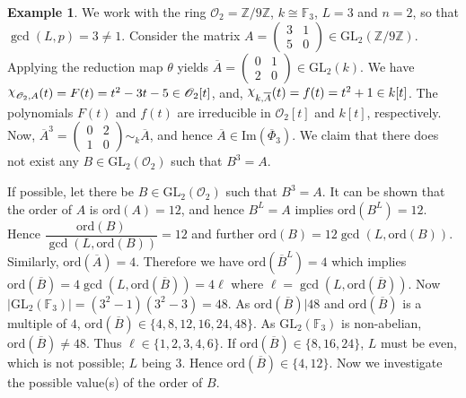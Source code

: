 \documentclass[11pt,twoside]{amsart}
\newcommand{\GL}{\mathrm{GL}}
\newcommand{\im}{\mathrm{Im}}
\newcommand{\upchi}{\raisebox{0.4ex}{$\chi$}}
\newcommand{\Char}{\upchi}
\newcommand{\R}{\mathscr{O}_2}
\theoremstyle{definition} %
\newtheorem{example}[lemma]{Example}
\begin{document}
\begin{example}
We work with the ring $\R=\mathbb{Z}/9\mathbb{Z}$, $k\cong\mathbb{F}_3$, $L=3$ and $n=2$, so that $\gcd(L,p)=3\neq 1$. 
Consider the matrix $A= \begin{pmatrix}
 3 & 1 \\
5 & 0
\end{pmatrix} \in \GL_2(\mathbb{Z}/9\mathbb{Z})$. 
Applying the reduction map $\theta$ yields $\overline{A}= \begin{pmatrix}
 0 & 1 \\
2 & 0
\end{pmatrix}\in \GL_2(k) $.
We have $\Char_{\R,A}(t)=F(t)=t^2-3t-5\in \R[t]$, and, $\Char_{k,\overline{A}}(t)=f(t)=t^2+1\in k[t]$. 
The polynomials $F(t)$ and $f(t)$ are irreducible in $\R[t]$ and $k[t]$, respectively. 
Now, $\overline{A}^3=\begin{pmatrix}
    0 & 2\\ 1 & 0
\end{pmatrix}\sim_{k}\overline{A}$, and hence $\overline{A}\in \im(\overline{\Phi}_3)$. 
We claim that there does not exist any $B\in \GL_2(\R)$ such that $B^3=A$.


If possible, let there be $B\in \GL_2(\R)$ such that $B^3=A$. It can be shown that the order of $A$ is $\textrm{ord}(A)=12$, and hence
 $B^L=A$ implies $\textrm{ord}(B^L)=12$. 
 Hence $\dfrac{\textrm{ord}(B)}{\gcd(L,\textrm{ord}(B))}=12$ and further $ \textrm{ord}(B)=12\gcd(L,\textrm{ord}(B))$. 
Similarly, $\textrm{ord}(\overline{A})=4$. 
Therefore we have $\textrm{ord}(\overline{B}^L)=4$ which implies $ \textrm{ord}(\overline{B})=4\gcd(L,\textrm{ord}(\overline{B}))=4\ell$ where $\ell= \gcd(L,\textrm{ord}(\overline{B}))$.
Now $|\GL_2(\mathbb{F}_3)|= (3^2-1)(3^2-3)=48$. 
As $\textrm{ord}(\overline{B})|48$ and $\textrm{ord}(\overline{B})$ is a multiple of $4$, $\textrm{ord}(\overline{B})\in\{4,8,12,16,24,48\}$.
As $\GL_2(\mathbb{F}_3)$ is non-abelian, $\textrm{ord}(\overline{B})\neq 48$. 
Thus $\ell\in\{1,2,3,4,6\}$.
If $\textrm{ord}(\overline{B})\in\{8,16,24\}$, $L$ must be even, which is not possible; $L$ being $3$.
Hence  $\textrm{ord}(\overline{B})\in\{4,12\}$. 
Now we investigate the possible value(s) of the order of $B$.


\end{example}
\end{document}
